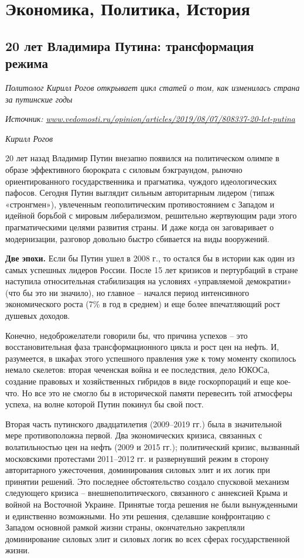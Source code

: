 \chapter{Экономика, Политика, История}


\section{20 лет Владимира Путина: трансформация режима}

\textit{Политолог Кирилл Рогов открывает цикл статей о том, как изменилась страна за путинские годы}

\textit{Источник: \url{www.vedomosti.ru/opinion/articles/2019/08/07/808337-20-let-putina}}

\textit{Кирилл Рогов }

20 лет назад Владимир Путин внезапно появился на политическом олимпе в образе эффективного бюрократа с силовым бэкграундом, рыночно ориентированного государственника и прагматика, чуждого идеологических пафосов. Сегодня Путин выглядит сильным авторитарным лидером (типаж «стронгмен»), увлеченным геополитическим противостоянием с Западом и идейной борьбой с мировым либерализмом, решительно жертвующим ради этого прагматическими целями развития страны. И даже когда он заговаривает о модернизации, разговор довольно быстро сбивается на виды вооружений.

\textbf{Две эпохи.}
Если бы Путин ушел в 2008 г., то остался бы в истории как один из самых успешных лидеров России. После 15 лет кризисов и пертурбаций в стране наступила относительная стабилизация на условиях «управляемой демократии» (что бы это ни значило), но главное – начался период интенсивного экономического роста (7\% в год в среднем) и еще более впечатляющий рост душевых доходов.

Конечно, недоброжелатели говорили бы, что причина успехов – это восстановительная фаза трансформационного цикла и рост цен на нефть. И, разумеется, в шкафах этого успешного правления уже к тому моменту скопилось немало скелетов: вторая чеченская война и ее последствия, дело ЮКОСа, создание правовых и хозяйственных гибридов в виде госкорпораций и еще кое-что. Но все это не смогло бы в исторической памяти перевесить той атмосферы успеха, на волне которой Путин покинул бы свой пост.

Вторая часть путинского двадцатилетия (2009–2019 гг.) была в значительной мере противоположна первой. Два экономических кризиса, связанных с волатильностью цен на нефть (2009 и 2015 гг.); политический кризис, вызванный московскими протестами 2011–2012 гг. и развернувший режим в сторону авторитарного ужесточения, доминирования силовых элит и их логик при принятии решений. Это последнее обстоятельство создало спусковой механизм следующего кризиса – внешнеполитического, связанного с аннексией Крыма и войной на Восточной Украине. Принятые тогда решения не были вынужденными и единственно возможными. Но эти решения, сделавшие конфронтацию с Западом основной рамкой жизни страны, окончательно закрепляли доминирование силовых элит и силовых логик во всех сферах государственной жизни.

